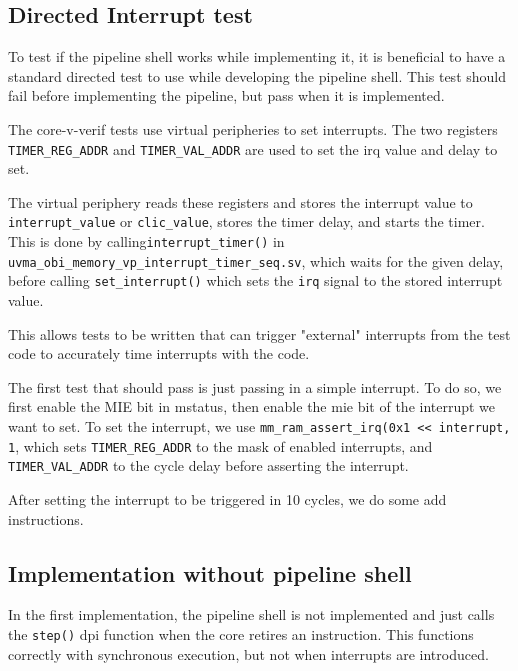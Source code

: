 
\subsection{Directed Interrupt test}

To test if the pipeline shell works while implementing it, it is beneficial to have a standard directed test to use while developing the pipeline shell.
This test should fail before implementing the pipeline, but pass when it is implemented.

The core-v-verif tests use virtual peripheries to set interrupts. 
The two registers \lstinline{TIMER_REG_ADDR} and \lstinline{TIMER_VAL_ADDR} are used to set the irq value and delay to set.  

The virtual periphery reads these registers and stores the interrupt value to \lstinline{interrupt_value} or \lstinline{clic_value}, stores the timer delay, and starts the timer. This is done by calling\lstinline{interrupt_timer()} in \lstinline{uvma_obi_memory_vp_interrupt_timer_seq.sv}, which waits for the given delay, before calling \lstinline{set_interrupt()} which sets the \lstinline{irq} signal to the stored interrupt value. 

This allows tests to be written that can trigger "external" interrupts from the test code to accurately time interrupts with the code.

The first test that should pass is just passing in a simple interrupt. To do so, we first enable the MIE bit in mstatus, then enable the mie bit of the interrupt we want to set. To set the interrupt, we use \lstinline{mm_ram_assert_irq(0x1 << interrupt, 1}, which sets \lstinline{TIMER_REG_ADDR} to the mask of enabled interrupts, and \lstinline{TIMER_VAL_ADDR} to the cycle delay before asserting the interrupt.

After setting the interrupt to be triggered in 10 cycles, we do some add instructions.




\subsection{Implementation without pipeline shell}

In the first implementation, the pipeline shell is not implemented and just calls the \lstinline{step()} dpi function when the core retires an instruction. This functions correctly with synchronous execution, but not when interrupts are introduced. 

